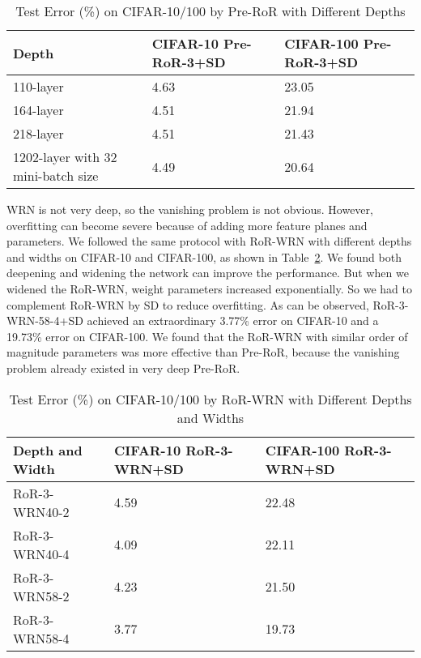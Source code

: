 \documentclass[journal]{IEEEtran}
\begin{document}
\begin{table}[!t]
\renewcommand{\arraystretch}{1.3}
\caption{Test Error (\%) on CIFAR-10/100 by Pre-RoR with Different Depths}
\label{tab:Pre-RoRDFDepth}
\centering
\begin{tabular}{|p{2.4cm}|p{2.3cm}|p{2.3cm}|}
\hline
Depth           &CIFAR-10 Pre-RoR-3+SD             &CIFAR-100 Pre-RoR-3+SD  \\ \hline\hline
110-layer       &4.63                                  &23.05               \\\hline
164-layer       &4.51                                  &21.94               \\\hline
218-layer       &4.51                                  &21.43               \\\hline
1202-layer with 32 mini-batch size       &4.49                                  &20.64               \\\hline
\end{tabular}
\end{table}
\par 
WRN is not very deep, so the vanishing problem is not obvious. However, overfitting can become severe because of adding more feature planes and parameters. We followed the same protocol with RoR-WRN with different depths and widths on CIFAR-10 and CIFAR-100, as shown in Table~\ref{tab:RoRWRNDFDepth}. We found both deepening and widening the network can improve the performance. But when we widened the RoR-WRN, weight parameters increased exponentially. So we had to complement RoR-WRN by SD to reduce overfitting. As can be observed, RoR-3-WRN-58-4+SD achieved an extraordinary 3.77\% error on CIFAR-10 and a 19.73\% error on CIFAR-100. We found that the RoR-WRN with similar order of magnitude parameters was more effective than Pre-RoR, because the vanishing problem already existed in very deep Pre-RoR.
\begin{table}[!t]
\renewcommand{\arraystretch}{1.3}
\caption{Test Error (\%) on CIFAR-10/100 by RoR-WRN with Different Depths and Widths}
\label{tab:RoRWRNDFDepth}
\centering
\begin{tabular}{|p{2.4cm}|p{2.3cm}|p{2.3cm}|}
\hline
Depth and Width           &CIFAR-10 RoR-3-WRN+SD             &CIFAR-100 RoR-3-WRN+SD  \\ \hline\hline
RoR-3-WRN40-2       &4.59                                  &22.48               \\\hline
RoR-3-WRN40-4       &4.09                                  &22.11               \\\hline
RoR-3-WRN58-2       &4.23                                  &21.50               \\\hline
RoR-3-WRN58-4       &3.77                                  &19.73               \\\hline
\end{tabular}
\end{table}
\end{document}
